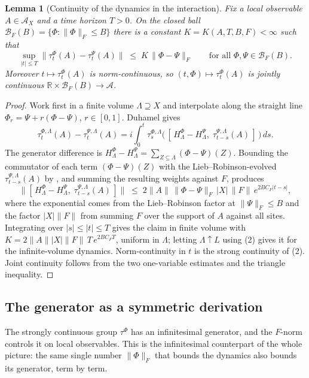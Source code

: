 \documentclass[12pt]{article}
\newcommand{\Ffun}{F}                          %
\newcommand{\qA}{\mathcal{A}}
\newcommand{\Ball}[1]{\mathcal{B}_{F}(#1)}      %
\newcommand{\norm}[1]{\lVert #1\rVert}
\newcommand{\Fnorm}[1]{\lVert #1\rVert_{F}}
\newcommand{\R}{\mathbb{R}}
\newtheorem{lemma}[theorem]{Lemma}
\theoremstyle{definition}
\theoremstyle{remark}
\begin{document}
\begin{lemma}[Continuity of the dynamics in the interaction]
\label{lem:dynamics-lipschitz}
Fix a local observable $A\in\qA_X$ and a time horizon $T>0$. On the closed ball
$\Ball{B}=\{\Phi:\Fnorm{\Phi}\le B\}$ there is a constant
$K=K(A,T,B,\Ffun)<\infty$ such that
\[
  \sup_{\lvert t\rvert\le T}\bigl\lVert\tau^\Phi_t(A)-\tau^\Psi_t(A)\bigr\rVert
  \;\le\;K\,\Fnorm{\Phi-\Psi}
  \qquad\text{for all }\Phi,\Psi\in\Ball{B}.
\]
Moreover $t\mapsto\tau^\Phi_t(A)$ is norm-continuous, so
$(t,\Phi)\mapsto\tau^\Phi_t(A)$ is jointly continuous $\R\times\Ball{B}\to\qA$.
\end{lemma}
\begin{proof}
Work first in a finite volume $\Lambda\supseteq X$ and interpolate along the straight line
$\Phi_r=\Psi+r(\Phi-\Psi)$, $r\in[0,1]$. Duhamel gives
\[
  \tau^{\Phi,\Lambda}_t(A)-\tau^{\Psi,\Lambda}_t(A)
  = i\int_0^t \tau^{\Phi,\Lambda}_{s}
      \bigl(\,[\,H^{\Phi}_\Lambda-H^{\Psi}_\Lambda,\;
              \tau^{\Psi,\Lambda}_{t-s}(A)\,]\,\bigr)\,ds .
\]
The generator difference is $H^{\Phi}_\Lambda-H^{\Psi}_\Lambda=\sum_{Z\subseteq\Lambda}
(\Phi-\Psi)(Z)$. Bounding the commutator of each term $(\Phi-\Psi)(Z)$ with the
Lieb--Robinson-evolved $\tau^{\Psi,\Lambda}_{t-s}(A)$ by , and summing the
resulting weights against $\Ffun$, produces
\[
  \bigl\lVert[\,H^{\Phi}_\Lambda-H^{\Psi}_\Lambda,\;\tau^{\Psi,\Lambda}_{t-s}(A)\,]\bigr\rVert
  \;\le\; 2\norm{A}\,\Fnorm{\Phi-\Psi}\,\lvert X\rvert\,\norm{\Ffun}\,
     e^{2BC_\Ffun\lvert t-s\rvert},
\]
where the exponential comes from the Lieb--Robinson factor at $\Fnorm{\Psi}\le B$ and the
factor $\lvert X\rvert\norm{\Ffun}$ from summing $\Ffun$ over the support of $A$ against all
sites. Integrating over $\lvert s\rvert\le\lvert t\rvert\le T$ gives the claim in finite
volume with $K=2\norm{A}\lvert X\rvert\norm{\Ffun}\,T\,e^{2BC_\Ffun T}$, uniform in $\Lambda$;
letting $\Lambda\uparrow L$ using (2) gives it for the infinite-volume
dynamics. Norm-continuity in $t$ is the strong continuity of (2). Joint
continuity follows from the two one-variable estimates and the triangle inequality.
\end{proof}

\subsection{The generator as a symmetric derivation}
\label{sec:lr-generator}

The strongly continuous group $\tau^\Phi$ has an infinitesimal generator, and the
$\Ffun$-norm controls it on local observables. This is the infinitesimal counterpart of the
whole picture: the same single number $\Fnorm{\Phi}$ that bounds the dynamics also bounds its
generator, term by term.
\end{document}
